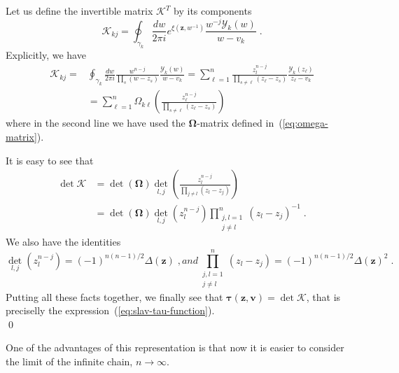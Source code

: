 \documentclass[a4paper,12pt]{amsart}
\begin{document}
Let us define the invertible matrix \(\bm{\mathcal{K}}^T\) by its components
\begin{equation}
    \mathcal{K}_{kj} = 
\oint_{\gamma_k} \frac{d w}{2\pi i} e^{\xi(\bm{z}, w^{-1})} \frac{w^{-j}\mathcal{Y}_k(w)}{w - v_k}\;. 
\end{equation}
Explicitly, we have 
\begin{equation}
  \begin{split}
    \mathcal{K}_{kj}
    = & \oint_{\gamma_k} \frac{d w}{2\pi i} \frac{w^{n-j}}{\prod_{s} (w - z_s)}
    \frac{\mathcal{Y}_k(w)}{w - v_k} = \sum_{\ell =1}^n \frac{z_l^{n-j}}{\prod_{s\neq \ell} (z_\ell - z_s)}
    \frac{\mathcal{Y}_k(z_\ell)}{z_\ell - v_k}\\
    & = \sum_{\ell = 1}^n  \Omega_{k \ell} \left( \frac{z_\ell^{n-j}}{\prod_{s\neq \ell} (z_\ell - z_s)} \right)
  \end{split}
\end{equation}
where in the second line we have used the \(\bm{\Omega}\)-matrix
defined in~(\ref{eq:omega-matrix}).

It is easy to see that
\begin{equation}
  \begin{split}
  \det \bm{\mathcal{K}} & = \det(\bm{\Omega}) \det_{l,j}\left( \frac{z_l^{n-j}}{\prod_{j\neq l} (z_l - z_j)}\right) \\
  & = \det(\bm{\Omega}) \det_{l, j}(z_l^{n-j}) \prod_{\substack{j, l =1 \\ j \neq l}}^n (z_l - z_j)^{-1} \; .
  \end{split}
\end{equation}
We also have the identities 
\begin{subequations}
  \begin{equation}
	\det_{l,j}(z_l^{n-j}) = (-1)^{n(n-1)/2} \Delta(\bm{z})\; ,
  \end{equation}
  and
  \begin{equation}
	\prod_{\substack{j, l = 1 \\ j \neq l}}^n (z_l - z_j) = (-1)^{n(n-1)/2} \Delta(\bm{z})^2\; . 
  \end{equation}
\end{subequations}
Putting all these facts together, we finally see that 
\(\bm{\tau}(\bm{z}, \bm{v}) = \det\bm{\mathcal{K}}\), that
is preciselly the expression~(\ref{eq:slav-tau-function}).\\
\qed

One of the advantages of this representation is
that now it is easier to consider the limit of the infinite chain,
\(n\to \infty\).
\end{document}
